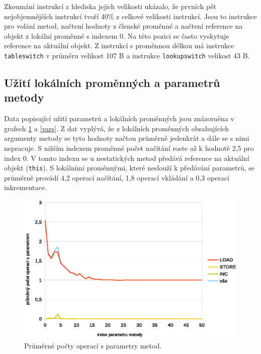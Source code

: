 Zkoumání instrukcí z hlediska jejich velikosti ukázalo, že prvních pět nejobjemnějších instrukcí tvoří 40\% z celkové velikosti instrukcí. Jsou to instrukce pro volání metod, načtení hodnoty z členské proměnné a načtení reference na objekt z lokální proměnné s indexem 0. Na této pozici se často vyskytuje reference na aktuální objekt. Z instrukcí s proměnnou délkou má instrukce \texttt{tableswitch} v průměru velikost 107 B a instrukce \texttt{lookupswitch} velikost 43 B.


\subsection{Užití lokálních proměnných a parametrů metody}

Data popisující užití parametrů a lokálních proměnných jsou znázorněna v grafech \ref{params} a \ref{vars}. Z dat vyplývá, že z lokálních proměnných obsahujících argumenty metody se tyto hodnoty načtou průměrně jedenkrát a dále se s nimi nepracuje. S nižším indexem proměnné počet načítání roste až k hodnotě 2,5 pro index 0. V tomto indexu se u nestatických metod předává reference na aktuální objekt (\texttt{this}). S lokálními proměnnými, které neslouží k předávání parametrů, se průměrně provádí 4,2 operací načítání, 1,8 operací vkládání a 0,3 operací inkrementace.

\begin{figure}[h!]
\centering
\includegraphics[scale=0.9]{fig/params}
\caption{Průměrné počty operací s parametry metod.}\label{params}
\end{figure}

